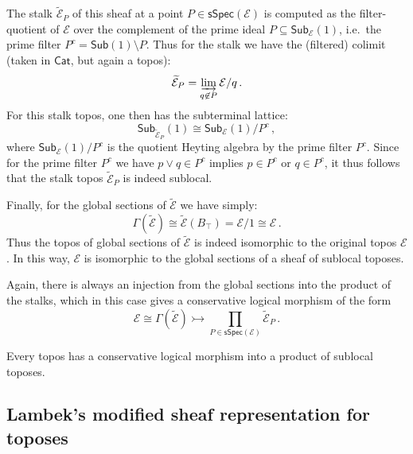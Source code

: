 \documentclass[graybox]{svmult}
\newcommand{\EE}{\ensuremath{\mathcal{E}}}
\begin{document}
The stalk $\widetilde{\EE}_P$ of this sheaf at a point $P\in \mathsf{sSpec}(\EE)$ is computed as the filter-quotient of $\EE$ over the complement of the prime ideal $P\subseteq  \mathsf{Sub}_{\EE}(1)$, i.e.\ the prime filter $P^c = \mathsf{Sub}(1)\!\setminus\! P$.  Thus for the stalk we have the (filtered) colimit (taken in $\mathsf{Cat}$, but again a topos):
\[
\widetilde{\EE}_P = \varinjlim_{q\not\in P} \EE/q\,.
\]
For this stalk topos, one then has the subterminal lattice:
\[
\mathsf{Sub}_{\widetilde{\EE}_P}(1)\cong \mathsf{Sub}_{\EE}(1)/P^c\,,
\]
where $\mathsf{Sub}_{\EE}(1)/P^c$ is the quotient Heyting algebra by the prime filter $P^c$.  Since for the prime filter $P^c$ we have $p \vee q \in P^c$ implies $p \in P^c$ or $q \in P^c$, it thus follows that the stalk topos $\widetilde{\EE}_P$ is indeed sublocal.


Finally, for the global sections of $\widetilde{\EE}$ we  have simply:
$$\Gamma(\widetilde{\EE}) \cong \widetilde{\EE}(B_\top) = \EE/1 \cong \EE\,.$$
Thus the topos of global sections of $\widetilde{\EE}$ is indeed isomorphic to the original topos $\EE$.  In this way, $\EE$ is isomorphic to the global sections of a sheaf of sublocal toposes.
\medskip

Again, there is always an injection from the global sections into the product of the stalks, which in this case gives a conservative logical morphism of the form
\[
\EE \cong \Gamma(\widetilde{\EE}) \rightarrowtail \prod_{P\in \mathsf{sSpec}(\EE)}\!\widetilde{\EE}_P\,.
\]

\begin{corollary}\label{cor:SDPtopos}
Every topos has a conservative logical morphism into a product of sublocal toposes.
\end{corollary}

\subsection{Lambek's modified sheaf representation for toposes}
\end{document}
